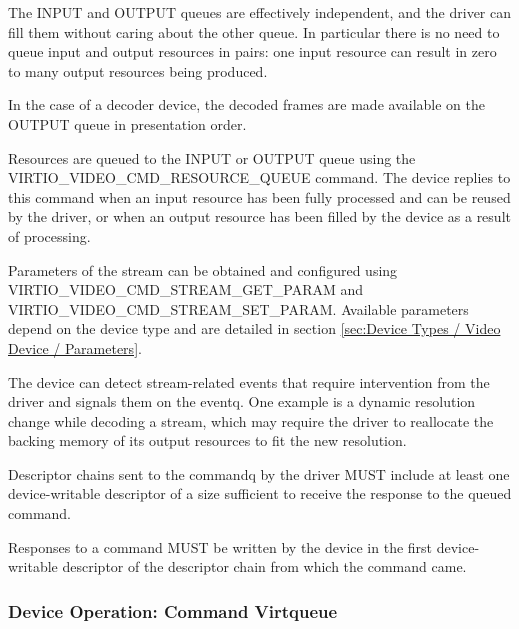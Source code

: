 The INPUT and OUTPUT queues are effectively independent, and the driver
can fill them without caring about the other queue. In particular there
is no need to queue input and output resources in pairs: one input
resource can result in zero to many output resources being produced.

In the case of a decoder device, the decoded frames are made available
on the OUTPUT queue in presentation order.

Resources are queued to the INPUT or OUTPUT queue using the
VIRTIO_VIDEO_CMD_RESOURCE_QUEUE command. The device replies to this
command when an input resource has been fully processed and can be
reused by the driver, or when an output resource has been filled by the
device as a result of processing.

Parameters of the stream can be obtained and configured using
VIRTIO_VIDEO_CMD_STREAM_GET_PARAM and
VIRTIO_VIDEO_CMD_STREAM_SET_PARAM. Available parameters depend on
the device type and are detailed in section
\ref{sec:Device Types / Video Device / Parameters}.

The device can detect stream-related events that require intervention
from the driver and signals them on the eventq. One example is a dynamic
resolution change while decoding a stream, which may require the driver
to reallocate the backing memory of its output resources to fit the new
resolution.


Descriptor chains sent to the commandq by the driver MUST include at
least one device-writable descriptor of a size sufficient to receive the
response to the queued command.


Responses to a command MUST be written by the device in the first
device-writable descriptor of the descriptor chain from which the
command came.

\subsubsection{Device Operation: Command Virtqueue}\label{sec:Device Types / Video Device / Device Operation / Device Operation: Command Virtqueue}

